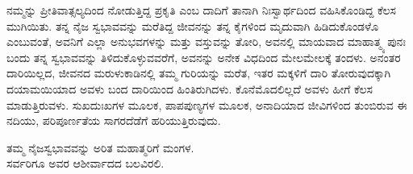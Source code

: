 \vspace{-0.3cm}


\vfill\eject

ನಮ್ಮನ್ನು ಪ್ರೀತಿವಾತ್ಸಲ್ಯದಿಂದ ನೋಡುತ್ತಿದ್ದ ಪ್ರಕೃತಿ ಎಂಬ ದಾದಿಗೆ ತಾನಾಗಿ ನಿಃಸ್ವಾರ್ಥದಿಂದ ವಹಿಸಿಕೊಂಡಿದ್ದ ಕೆಲಸ ಮುಗಿಯಿತು. ತನ್ನ ನೈಜ ಸ್ವಭಾವವನ್ನು ಮರೆತಿದ್ದ ಜೀವನನ್ನು ತನ್ನ ಕೈಗಳಿಂದ ಮೃದುವಾಗಿ ಹಿಡಿದುಕೊಂಡಳೊ ಎಂಬುವಂತೆ, ಅವನಿಗೆ ಎಲ್ಲಾ ಅನುಭವಗಳನ್ನು ಮತ್ತು ವಸ್ತುವನ್ನು ತೋರಿ, ಅವನಲ್ಲಿ ಮಾಯವಾದ ಮಾಹಾತ್ಮ್ಯ ಪುನಃ ಬಂದು ತನ್ನ ಸ್ವಭಾವವನ್ನು ತಿಳಿದುಕೊಳ್ಳುವವರೆಗೆ, ಅವನನ್ನು ಅನೇಕ ವಿಧದಿಂದ ಮೇಲಮೇಲಕ್ಕೆ ತಂದಳು. ಅನಂತರ ದಾರಿಯಿಲ್ಲದ, ಜೀವನದ ಮರುಳುಕಾಡಿನಲ್ಲಿ ತಮ್ಮ ಗುರಿಯನ್ನು ಮರೆತ, ಇತರ ಮಕ್ಕಳಿಗೆ ದಾರಿ ತೋರುವುದಕ್ಕಾಗಿ ದಯಾಮಯಿಯಾದ ಅವಳು ಬಂದ ದಾರಿಯಿಂದ ಹಿಂತಿರುಗಿದಳು. ಕೊನೆಮೊದಲಿಲ್ಲದೆ ಅವಳು ಹೀಗೆ ಕೆಲಸ ಮಾಡುತ್ತಿರುವಳು. ಸುಖದುಃಖಗಳ ಮೂಲಕ, ಪಾಪಪುಣ್ಯಗಳ ಮೂಲಕ, ಅನಾದಿಯಾದ ಜೀವಿಗಳಿಂದ ತುಂಬಿರುವ ಈ ನದಿಯು, ಪರಿಪೂರ್ಣತೆಯ ಸಾಗರದೆಡೆಗೆ ಹರಿಯುತ್ತಿರುವುದು.

\begin{center}
ತಮ್ಮ ನೈಜಸ್ವಭಾವವನ್ನು ಅರಿತ ಮಹಾತ್ಮರಿಗೆ ಮಂಗಳ. \\ ಸರ್ವರಿಗೂ ಅವರ ಆಶೀರ್ವಾದದ ಬಲವಿರಲಿ. 
\end{center}

